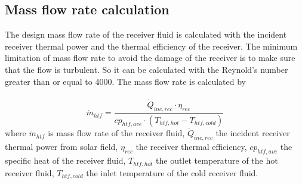 \subsection{Mass flow rate calculation}
The design mass flow rate of the receiver fluid is calculated with the incident receiver thermal power and the thermal efficiency of the receiver. The minimum limitation of mass flow rate to avoid the damage of the receiver is to make sure that the flow is turbulent. So it can be calculated with the Reynold's number greater than or equal to 4000. The mass flow rate is calculated by \\\\
\begin{equation}
\dot m_{htf}= \frac{\dot Q_{inc,rec}\cdot \eta_{rec}}{cp_{htf,ave}\cdot (T_{htf,hot}-T_{htf,cold})}
\end{equation}
where $\dot m_{htf}$ is mass flow rate of the receiver fluid, $\dot Q_{inc,rec}$ the incident receiver thermal power from solar field, $\eta_{rec}$ the receiver thermal efficiency, $cp_{htf,ave}$ the specific heat of the receiver fluid, $T_{htf,hot}$ the outlet temperature of the hot receiver fluid, $T_{htf,cold}$ the inlet temperature of the cold receiver fluid.
